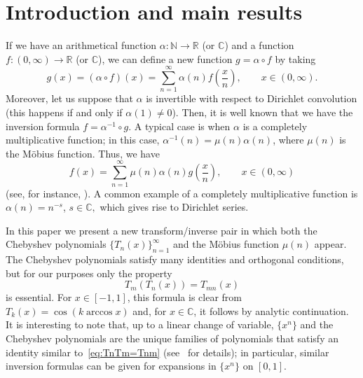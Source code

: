 \documentclass[10pt,a4paper]{amsart}
\theoremstyle{plain}
\theoremstyle{remark}
\newcommand{\N}{\mathbb{N}}
\newcommand{\R}{\mathbb{R}}
\newcommand{\C}{\mathbb{C}}
\begin{document}
\maketitle


\section{Introduction and main results}

If we have an arithmetical function $\alpha: \N \to \R$ (or $\C$) and a function
$f: (0,\infty) \to \R$ (or $\C$), we can define a new function
$g = \alpha  \circ f$ by taking
\begin{equation}
\label{eq:convocirc}
  g(x) = (\alpha \circ f)(x) = \sum_{n=1}^\infty \alpha(n) f\left(\frac xn\right),
  \qquad x \in (0,\infty).
\end{equation}
Moreover, let us suppose that $\alpha$ is invertible with respect to Dirichlet
convolution (this happens if and only if $\alpha(1) \ne 0$).
Then, it is well known that we have the inversion formula
$f = \alpha^{-1} \circ g$.
A typical case is when $\alpha$ is a completely multiplicative function;
in this case, $\alpha^{-1}(n) = \mu(n)\alpha(n)$,
where $\mu(n)$ is the M\"obius function.
Thus, we have
\begin{equation*}
  f(x) = \sum_{n=1}^\infty \mu(n)\alpha(n) g\left(\frac xn\right),
  \qquad x \in (0,\infty)
\end{equation*}
(see, for instance, \cite{Ha-Wr}).
A common example of a completely multiplicative function is
$\alpha(n) = n^{-s}$, $s \in \C,$ which gives rise to Dirichlet series.

In this paper we present a new transform/inverse pair in which
both the Chebyshev polynomials $\{T_n(x)\}_{n=1}^\infty$
and the M\"obius function $\mu(n)$ appear.
The Chebyshev polynomials satisfy many identities and orthogonal conditions,
but for our purposes only the property
\begin{equation}
\label{eq:TnTm=Tnm}
  T_m(T_n(x)) = T_{mn}(x)
\end{equation}
is essential.
For $x \in [-1,1]$, this formula is clear from $T_k(x) = \cos(k\arccos x)$ and,
for $x \in \C$, it follows by analytic continuation.
It is interesting to note that, up to a linear change of variable,
$\{x^n\}$ and the Chebyshev polynomials are the unique families of
polynomials that satisfy an identity similar to~\eqref{eq:TnTm=Tnm}
(see~\cite[Chapter~4, Th.~4.4]{Ri} for details);
in particular, similar inversion formulas can be given for
expansions in $\{x^n\}$ on $[0,1]$.
\end{document}
